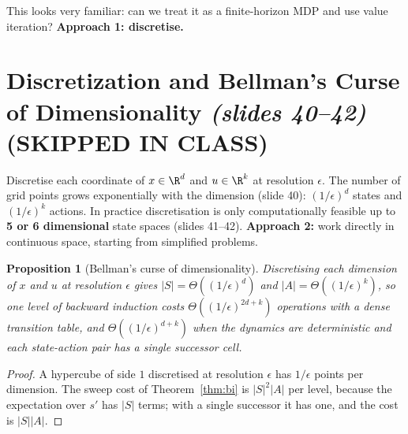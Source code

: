 \documentclass[11pt,a4paper]{article}
\newcommand{\slides}[1]{\emph{(slides #1)}}
\theoremstyle{plain}
\newtheorem{proposition}[theorem]{Proposition}
\theoremstyle{definition}
\theoremstyle{remark}
\begin{document}
This looks very familiar: can we treat it as a finite-horizon MDP and use value iteration? \textbf{Approach 1: discretise.}

\section{Discretization and Bellman's Curse of Dimensionality \slides{40--42} (SKIPPED IN CLASS)}

Discretise each coordinate of $x\in\R^d$ and $u\in\R^k$ at resolution $\epsilon$. The number of grid points grows exponentially with the dimension (slide 40): $(1/\epsilon)^d$ states and $(1/\epsilon)^k$ actions. In practice discretisation is only computationally feasible up to \textbf{5 or 6 dimensional} state spaces (slides 41--42). \textbf{Approach 2:} work directly in continuous space, starting from simplified problems.

\begin{proposition}[Bellman's curse of dimensionality]\label{prop:curse}
Discretising each dimension of $x$ and $u$ at resolution $\epsilon$ gives $|S|=\Theta((1/\epsilon)^d)$ and $|A|=\Theta((1/\epsilon)^k)$, so one level of backward induction costs $\Theta((1/\epsilon)^{2d+k})$ operations with a dense transition table, and $\Theta((1/\epsilon)^{d+k})$ when the dynamics are deterministic and each state-action pair has a single successor cell.
\end{proposition}
\begin{proof}
A hypercube of side $1$ discretised at resolution $\epsilon$ has $1/\epsilon$ points per dimension. The sweep cost of Theorem~\ref{thm:bi} is $|S|^2|A|$ per level, because the expectation over $s'$ has $|S|$ terms; with a single successor it has one, and the cost is $|S||A|$.
\end{proof}
\end{document}
